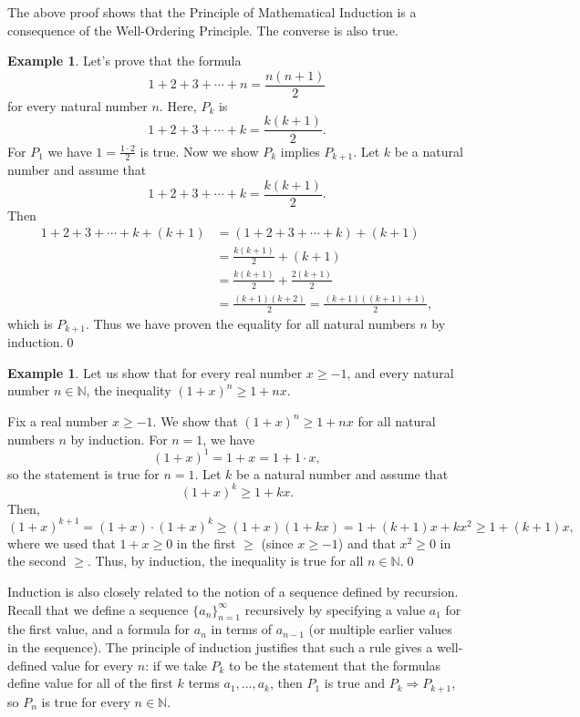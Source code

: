 \documentclass[12pt]{amsart}
\newcommand{\N}{\mathbb{N}}
\numberwithin{equation}{section}
\theoremstyle{plain} %
\theoremstyle{definition}
\newtheorem{ex}[equation]{Example}
\theoremstyle{remark}
\begin{document}
The above proof shows that the Principle of Mathematical Induction is a consequence of the Well-Ordering Principle. The converse is also true.

\begin{ex}
Let's prove that the formula
\[ 1 + 2 + 3 + \cdots + n = \frac{n(n+1)}{2}\]
for every natural number $n$.
Here, $P_k$ is
\[ 1 + 2 + 3 + \cdots + k = \frac{k(k+1)}{2}.\]
For $P_1$ we have $1 = \frac{1 \cdot 2}{2}$ is true. Now we show $P_k$ implies $P_{k+1}$. Let $k$ be a natural number and assume that 
\[ 1 + 2 + 3 + \cdots + k = \frac{k(k+1)}{2}.\] Then 
\begin{align*} 1 + 2 + 3 + \cdots + k + (k+1) &= (1 + 2 + 3 + \cdots + k )+ (k+1) \\&= \frac{k(k+1)}{2} + (k+1) \\&=  \frac{k(k+1)}{2} + \frac{2(k+1)}{2} \\& = \frac{(k+1)(k+2)}{2} = \frac{(k+1)((k+1)+1)}{2},\end{align*}
which is $P_{k+1}$. Thus we have proven the equality for all natural numbers $n$ by induction.\qed
\end{ex}

\begin{ex} Let us show that for every real number $x\geq -1$, and every natural number $n\in \N$, the inequality $(1+x)^n \geq 1+nx$.

Fix a real number $x\geq -1$. We show that $(1+x)^n \geq 1+nx$ for all natural numbers $n$ by induction. For $n=1$, we have 
\[ (1+x)^1 = 1+x = 1+ 1\cdot x,\]
so the statement is true for $n=1$. Let $k$ be a natural number and assume that
\[ (1+x)^k \geq 1+kx.\]
Then,
\[ (1+x)^{k+1} = (1+x)\cdot (1+x)^k \geq (1+x) (1+kx) = 1 + (k+1) x + kx^2 \geq 1 + (k+1) x,\]
where we used that $1+x\geq 0$ in the first $\geq$ (since $x\geq -1$) and that $x^2\geq 0$ in the second $\geq$.
Thus, by induction, the inequality is true for all $n\in \N$.\qed
\end{ex}


Induction is also closely related to the notion of a sequence defined by recursion. Recall that we define a sequence $\{a_n\}_{n=1}^\infty$ recursively by specifying a value $a_1$ for the first value, and a formula for $a_n$ in terms of $a_{n-1}$ (or multiple earlier values in the sequence). The principle of induction justifies that such a rule gives a well-defined value for every $n$: if we take $P_k$ to be the statement that the formulas define value for all of the first $k$ terms $a_1,\dots,a_k$, then $P_1$ is true and $P_k \Rightarrow P_{k+1}$, so $P_n$ is true for every $n\in \N$.
\end{document}
